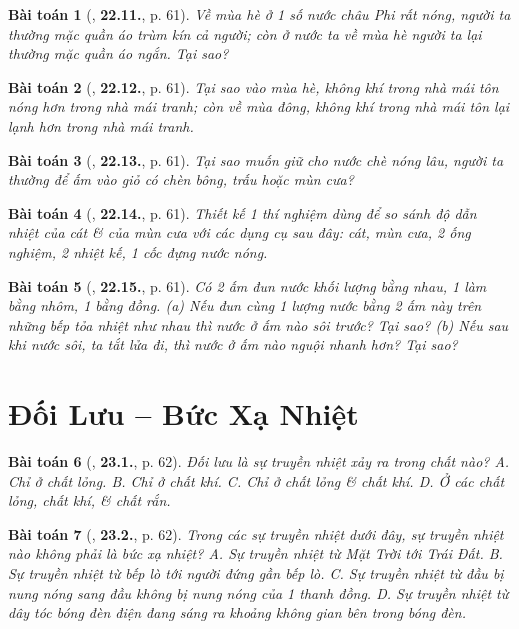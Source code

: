 \documentclass{article}
\numberwithin{equation}{section}
\newtheorem{baitoan}{Bài toán}
\begin{document}
\begin{baitoan}[\cite{SBT_Vat_Ly_8}, \textbf{22.11.}, p. 61]
	Về mùa hè ở 1 số nước châu Phi rất nóng, người ta thường mặc quần áo trùm kín cả người; còn ở nước ta về mùa hè người ta lại thường mặc quần áo ngắn. Tại sao?
\end{baitoan}

\begin{baitoan}[\cite{SBT_Vat_Ly_8}, \textbf{22.12.}, p. 61]
	Tại sao vào mùa hè, không khí trong nhà mái tôn nóng hơn trong nhà mái tranh; còn về mùa đông, không khí trong nhà mái tôn lại lạnh hơn trong nhà mái tranh.
\end{baitoan}

\begin{baitoan}[\cite{SBT_Vat_Ly_8}, \textbf{22.13.}, p. 61]
	Tại sao muốn giữ cho nước chè nóng lâu, người ta thường để ấm vào giỏ có chèn bông, trấu hoặc mùn cưa?
\end{baitoan}

\begin{baitoan}[\cite{SBT_Vat_Ly_8}, \textbf{22.14.}, p. 61]
	Thiết kế 1 thí nghiệm dùng để so sánh độ dẫn nhiệt của cát \& của mùn cưa với các dụng cụ sau đây: cát, mùn cưa, 2 ống nghiệm, 2 nhiệt kế, 1 cốc đựng nước nóng.
\end{baitoan}

\begin{baitoan}[\cite{SBT_Vat_Ly_8}, \textbf{22.15.}, p. 61]
	Có 2 ấm đun nước khối lượng bằng nhau, 1 làm bằng nhôm, 1 bằng đồng. (a) Nếu đun cùng 1 lượng nước bằng 2 ấm này trên những bếp tỏa nhiệt như nhau thì nước ở ấm nào sôi trước? Tại sao? (b) Nếu sau khi nước sôi, ta tắt lửa đi, thì nước ở ấm nào nguội nhanh hơn? Tại sao?
\end{baitoan}


\section{Đối Lưu -- Bức Xạ Nhiệt}

\begin{baitoan}[\cite{SBT_Vat_Ly_8}, \textbf{23.1.}, p. 62]
	Đối lưu là sự truyền nhiệt xảy ra trong chất nào? {\sf A.} Chỉ ở chất lỏng. {\sf B.} Chỉ ở chất khí. {\sf C.} Chỉ ở chất lỏng \& chất khí. {\sf D.} Ở các chất lỏng, chất khí, \& chất rắn.
\end{baitoan}

\begin{baitoan}[\cite{SBT_Vat_Ly_8}, \textbf{23.2.}, p. 62]
	Trong các sự truyền nhiệt dưới đây, sự truyền nhiệt nào không phải là bức xạ nhiệt? {\sf A.} Sự truyền nhiệt từ Mặt Trời tới Trái Đất. {\sf B.} Sự truyền nhiệt từ bếp lò tới người đứng gần bếp lò. {\sf C.} Sự truyền nhiệt từ đầu bị nung nóng sang đầu không bị nung nóng của 1 thanh đồng. {\sf D.} Sự truyền nhiệt từ dây tóc bóng đèn điện đang sáng ra khoảng không gian bên trong bóng đèn.
\end{baitoan}
\end{document}
